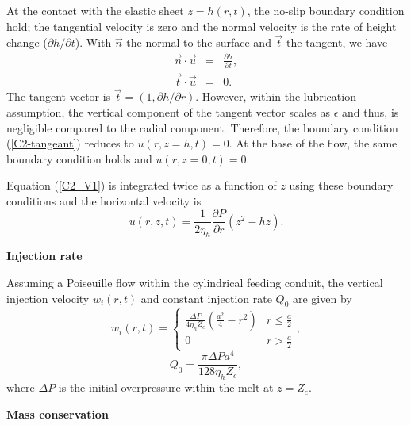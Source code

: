 At the contact with the elastic sheet $z=h(r,t)$, the no-slip boundary
condition  hold;  the  tangential  velocity is  zero  and  the  normal
velocity  is the  rate of  height change  ($\partial h/  \partial t$).
With $\vec{n}$ the normal to the surface and $\vec{t}$ the tangent, we
have
\begin{eqnarray}
  \vec{n} \cdot \vec{u} &=& \frac{\partial h }{\partial t},\\
  \vec{t} \cdot \vec{u} &=& 0. \label{C2-tangeant}
\end{eqnarray}
The  tangent  vector is  $\vec{t}  =  (1,  \partial h/  \partial  r)$.
However, within the lubrication  assumption, the vertical component of
the  tangent  vector scales  as  $\epsilon$  and thus,  is  negligible
compared to  the radial  component. Therefore, the  boundary condition
(\ref{C2-tangeant}) reduces  to $u(r,z=h,t) =0$.   At the base  of the
flow, the same boundary condition holds and $u(r,z=0,t) =0$.

Equation (\ref{C2_V1}) is integrated twice  as a function of $z$ using
these boundary conditions and the horizontal velocity is
\begin{equation}
  u(r,z,t) =\frac{1}{2\eta_h} \frac{\partial P}{\partial r} \left(z^2-hz\right).
  \label{C2-vel}
\end{equation}

\vspace{.5cm} \textbf{Injection rate} \vspace{.5cm}

Assuming a Poiseuille flow within the cylindrical feeding conduit, the
vertical  injection velocity  $w_i(r,t)$ and  constant injection  rate
$Q_0$ are given by
\begin{equation}
  w_i(r,t)=
  \begin{cases}
    \frac{ \Delta P}{4 \eta_h Z_{c}} (\frac{a^{2}}{4}-r^{2})& r \le \frac{a}{2}\\
    0 & r > \frac{a}{2}
  \end{cases},
  \label{C2-eq12}
\end{equation}
\begin{equation}
  Q_{0}=\frac{\pi \Delta P a^{4}}{128 \eta_h Z_c},
  \label{C2-eq11}
\end{equation}
where  $\Delta P$  is  the  initial overpressure  within  the melt  at
$z=Z_{c}$.

\vspace{.5cm} \textbf{Mass conservation} \vspace{.5cm}

